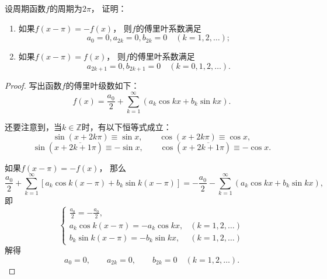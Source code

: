 \begin{example}
设周期函数\(f\)的周期为\(2\pi\)，
证明：\begin{enumerate}
\item 如果\(f(x-\pi) = -f(x)\)，
则\(f\)的傅里叶系数满足\begin{equation*}
	a_0 = 0,
	a_{2k} = 0,
	b_{2k} = 0
	\quad(k=1,2,\dotsc);
\end{equation*}
\item 如果\(f(x-\pi) = f(x)\)，
则\(f\)的傅里叶系数满足\begin{equation*}
	a_{2k+1} = 0,
	b_{2k+1} = 0
	\quad(k=0,1,2,\dotsc).
\end{equation*}
\end{enumerate}
\begin{proof}
写出函数\(f\)的傅里叶级数如下：\begin{equation*}
	f(x) = \frac{a_0}{2}
	+ \sum_{k=1}^\infty \left(
		a_k \cos kx
		+ b_k \sin kx
	\right).
\end{equation*}

还要注意到，当\(k\in\mathbb{Z}\)时，有以下恒等式成立：\begin{equation*}
	\sin(x+2k\pi) \equiv \sin x, \qquad
	\cos(x+2k\pi) \equiv \cos x,
\end{equation*}\begin{equation*}
	\sin(x+\overline{2k+1}\pi) \equiv -\sin x, \qquad
	\cos(x+\overline{2k+1}\pi) \equiv -\cos x.
\end{equation*}

如果\(f(x-\pi) = -f(x)\)，
那么\begin{equation*}
	\frac{a_0}{2} + \sum_{k=1}^\infty \left[
		a_k \cos k(x-\pi)
		+ b_k \sin k(x-\pi)
	\right]
	=
	-\frac{a_0}{2} - \sum_{k=1}^\infty \left(
		a_k \cos kx
		+ b_k \sin kx
	\right),
\end{equation*}
即\begin{equation*}
	\left\{ \begin{array}{ll}
		\frac{a_0}{2} = -\frac{a_0}{2}, \\
		a_k \cos k(x-\pi) = - a_k \cos kx, &(k=1,2,\dotsc) \\
		b_k \sin k(x-\pi) = - b_k \sin kx, &(k=1,2,\dotsc)
	\end{array} \right.
\end{equation*}
解得\begin{equation*}
	a_0 = 0, \qquad
	a_{2k} = 0, \qquad
	b_{2k} = 0
	\quad(k=1,2,\dotsc).
\end{equation*}


\end{proof}
\end{example}
